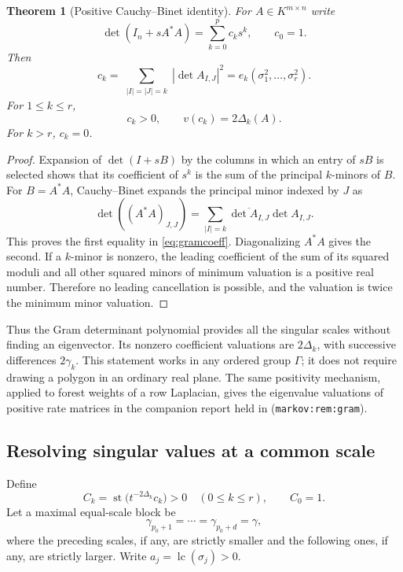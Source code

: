 \documentclass[11pt,a4paper]{article}
\numberwithin{equation}{section}
\newtheorem{theorem}{Theorem}[section]
\theoremstyle{definition}
\theoremstyle{remark}
\newcommand{\st}{\operatorname{st}}
\newcommand{\lc}{\operatorname{lc}}
\begin{document}
\begin{theorem}[Positive Cauchy--Binet identity]\label{thm:gram}
For $A\in K^{m\times n}$ write
\begin{equation}\label{eq:gramgen}
 \det(I_n+sA^*A)=\sum_{k=0}^p c_k s^k,
 \qquad c_0=1.
\end{equation}
Then
\begin{equation}\label{eq:gramcoeff}
 c_k=\sum_{\substack{|I|=|J|=k}}|\det A_{I,J}|^2
     =e_k(\sigma_1^2,\ldots,\sigma_r^2).
\end{equation}
For $1\le k\le r$,
\begin{equation}\label{eq:gramval}
 c_k>0,\qquad v(c_k)=2\Delta_k(A).
\end{equation}
For $k>r$, $c_k=0$.
\end{theorem}
\begin{proof}
Expansion of $\det(I+sB)$ by the columns in which an entry of $sB$ is
selected shows that its coefficient of $s^k$ is the sum of the principal
$k$-minors of $B$. For $B=A^*A$, Cauchy--Binet expands the principal minor
indexed by $J$ as
\[
 \det((A^*A)_{J,J})
 =\sum_{|I|=k}\overline{\det A_{I,J}}\det A_{I,J}.
\]
This proves the first equality in \eqref{eq:gramcoeff}. Diagonalizing
$A^*A$ gives the second. If a $k$-minor is nonzero, the leading coefficient
of the sum of its squared moduli and all other squared minors of minimum
valuation is a positive real number. Therefore no leading cancellation is
possible, and the valuation is twice the minimum minor valuation.
\end{proof}

Thus the Gram determinant polynomial provides all the singular scales
without finding an eigenvector. Its nonzero coefficient valuations are
$2\Delta_k$, with successive differences $2\gamma_k$. This statement works
in any ordered group $\Gamma$; it does not require drawing a polygon in an
ordinary real plane. The same positivity mechanism, applied to forest weights
of a row Laplacian, gives the eigenvalue valuations of positive rate matrices
in the companion report held in
(\texttt{markov:rem:gram}).

\subsection{Resolving singular values at a common scale}
Define
\[
 C_k=\st\bigl(t^{-2\Delta_k}c_k\bigr)>0\quad(0\le k\le r),
 \qquad C_0=1.
\]
Let a maximal equal-scale block be
\[
 \gamma_{p_0+1}=\cdots=\gamma_{p_0+d}=\gamma,
\]
where the preceding scales, if any, are strictly smaller and the following
ones, if any, are strictly larger. Write $a_j=\lc(\sigma_j)>0$.
\end{document}
